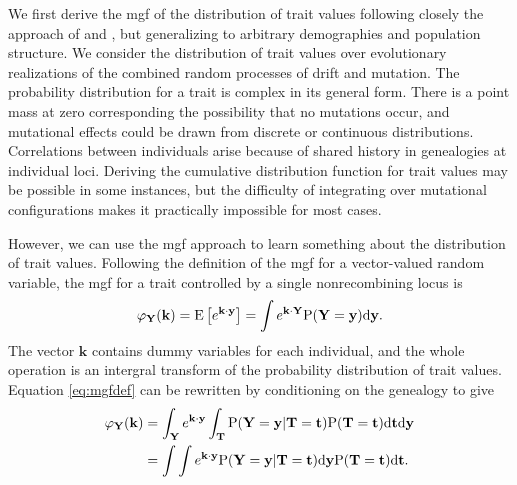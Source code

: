 We first derive the mgf of the distribution of trait values following closely
the approach of \citet{Schraiber2015} and \citet{Khaitovich2005}, but
generalizing to arbitrary demographies and population structure. We consider the
distribution of trait values over evolutionary realizations of the combined
random processes of drift and mutation. The probability distribution for a trait
is complex in its general form. There is a point mass at zero corresponding the
possibility that no mutations occur, and mutational effects could be drawn from
discrete or continuous distributions. Correlations between individuals arise
because of shared history in genealogies at individual loci. Deriving the
cumulative distribution function for trait values may be possible in some
instances, but the difficulty of integrating over mutational configurations
makes it practically impossible for most cases.

However, we can use the mgf approach to learn something about the distribution
of trait values. Following the definition of the mgf for a vector-valued random
variable, the mgf for a trait controlled by a single nonrecombining locus
is \citep{Ross}
\begin{equation}
  \label{eq:mgfdef}
  \varphi_{\mathbf{Y}}(\mathbf{k}) = \mathrm{E}\left[ e^{\mathbf{k} \cdot \mathbf{y}} \right] =
  \int e^{\mathbf{k} \cdot \mathbf{Y}} \mathrm{P}(\mathbf{Y}=\mathbf{y}) \mbox{d}\mathbf{y}.
\end{equation}
The vector $\mathbf{k}$ contains dummy variables for each individual, and the
whole operation is an intergral transform of the probability distribution of
trait values. Equation \eqref{eq:mgfdef} can be rewritten by conditioning on the
genealogy to give
\begin{align}
  \label{eq:cond}
  \varphi_{\mathbf{Y}}(\mathbf{k}) &= \int_{\mathbf{Y}} e^{\mathbf{k} \cdot \mathbf{y}}
  \int_{\mathbf{T}} \mathrm{P}(\mathbf{Y}=\mathbf{y} | \mathbf{T}=\mathbf{t}) \mathrm{P}(\mathbf{T}=\mathbf{t})
  \mbox{d}\mathbf{t} \mbox{d}\mathbf{y} \nonumber \\
  &= \int \int e^{\mathbf{k} \cdot \mathbf{y}} \mathrm{P}(\mathbf{Y}=\mathbf{y} | \mathbf{T}=\mathbf{t}) \mbox{d}\mathbf{y}
  \mathrm{P}(\mathbf{T}=\mathbf{t})
  \mbox{d}\mathbf{t}.
\end{align}

